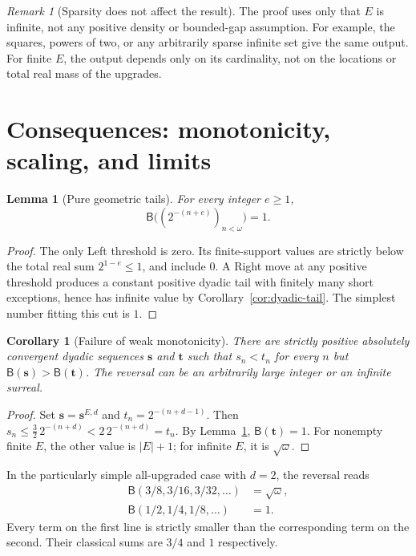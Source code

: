 \documentclass[11pt,letterpaper]{article}
\newtheorem{lemma}[theorem]{Lemma}
\newtheorem{corollary}[theorem]{Corollary}
\theoremstyle{definition}
\theoremstyle{remark}
\newtheorem{remark}[theorem]{Remark}
\newcommand{\BB}{\mathsf B}
\newcommand{\bs}{\boldsymbol{s}}
\newcommand{\bt}{\boldsymbol{t}}
\begin{document}
\begin{remark}[Sparsity does not affect the result]
The proof uses only that $E$ is infinite, not any positive density or bounded-gap
assumption. For example, the squares, powers of two, or any arbitrarily sparse
infinite set give the same output. For finite $E$, the output depends only on
its cardinality, not on the locations or total real mass of the upgrades.
\end{remark}

\section{Consequences: monotonicity, scaling, and limits}\label{sec:consequences}

\begin{lemma}[Pure geometric tails]\label{lem:pure-power}
For every integer $e\geq1$,
\begin{equation}\label{eq:pure-power}
                 \BB\bigl((2^{-(n+e)})_{n<\omega}\bigr)=1.
\end{equation}
\end{lemma}
\begin{proof}
The only Left threshold is zero. Its finite-support values are strictly below
the total real sum $2^{1-e}\leq1$, and include $0$. A Right move at any positive
threshold produces a constant positive dyadic tail with finitely many short
exceptions, hence has infinite value by Corollary~\ref{cor:dyadic-tail}.
The simplest number fitting this cut is $1$.
\end{proof}

\begin{corollary}[Failure of weak monotonicity]\label{cor:nonmonotone}
There are strictly positive absolutely convergent dyadic sequences $\bs$ and
$\bt$ such that $s_n<t_n$ for every $n$ but $\BB(\bs)>\BB(\bt)$.
The reversal can be an arbitrarily large integer or an infinite surreal.
\end{corollary}
\begin{proof}
Set $\bs=\bs^{E,d}$ and $t_n=2^{-(n+d-1)}$. Then
$s_n\leq\tfrac32\,2^{-(n+d)}<2\,2^{-(n+d)}=t_n$. By
Lemma~\ref{lem:pure-power}, $\BB(\bt)=1$. For nonempty finite $E$, the other value
is $|E|+1$; for infinite $E$, it is $\sqrt{\omega}$.
\end{proof}

In the particularly simple all-upgraded case with $d=2$, the reversal reads
\begin{align}
 \BB(3/8,3/16,3/32,\ldots)&=\sqrt{\omega},\label{eq:concrete-smaller}\\
 \BB(1/2,1/4,1/8,\ldots)&=1.\label{eq:concrete-larger}
\end{align}
Every term on the first line is strictly smaller than the corresponding term on
the second. Their classical sums are $3/4$ and $1$ respectively.
\end{document}
